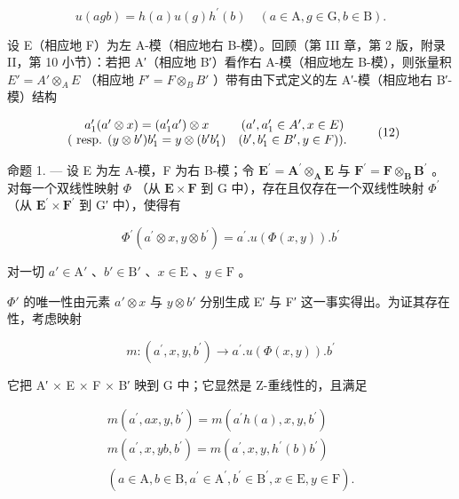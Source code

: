 \[
u (a g b) = h (a) u (g) h ^ {\prime} (b) \quad (a \in \mathrm{A}, g \in \mathrm{G}, b \in \mathrm{B}).\tag{11}
\]

设 E（相应地 F）为左 A-模（相应地右 B-模）。回顾（第 III 章，第 2 版，附录 II，第 10 小节）：若把 A′（相应地 B′）看作右 A-模（相应地左 B-模），则张量积 \(E' = A' \otimes_{A} E\) （相应地 \(F' = F \otimes_{B} B'\) ）带有由下式定义的左 A′-模（相应地右 B′-模）结构

\[
\begin{array}{c c} a _ {1} ^ {\prime} (a ^ {\prime} \otimes x) = (a _ {1} ^ {\prime} a ^ {\prime}) \otimes x & (a ^ {\prime}, a _ {1} ^ {\prime} \in A ^ {\prime}, x \in E) \\ (\text { resp. } (y \otimes b ^ {\prime}) b _ {1} ^ {\prime} = y \otimes (b ^ {\prime} b _ {1} ^ {\prime}) & (b ^ {\prime}, b _ {1} ^ {\prime} \in B ^ {\prime}, y \in F)). \end{array}\tag{12}
\]

命题 1. --- 设 E 为左 A-模，F 为右 B-模；令 \(\mathbf{E}^{\prime} = \mathbf{A}^{\prime}\otimes_{\mathbf{A}}\mathbf{E}\) 与 \(\mathbf{F}^{\prime} = \mathbf{F}\otimes_{\mathbf{B}}\mathbf{B}^{\prime}\) 。对每一个双线性映射 \(\Phi\) （从 \(\mathbf{E}\times \mathbf{F}\) 到 G 中），存在且仅存在一个双线性映射 \(\Phi^{\prime}\) （从 \(\mathbf{E}^{\prime}\times \mathbf{F}^{\prime}\) 到 G′ 中），使得有

\[
\Phi^ {\prime} (a ^ {\prime} \otimes x, y \otimes b ^ {\prime}) = a ^ {\prime}. u (\Phi (x, y)). b ^ {\prime}\tag{13}
\]

对一切 \(a' \in \mathrm{A}'\) 、\(b' \in \mathrm{B}'\) 、\(x \in \mathrm{E}\) 、\(y \in \mathrm{F}\) 。

\(\Phi'\) 的唯一性由元素 \(a' \otimes x\) 与 \(y \otimes b'\) 分别生成 E′ 与 F′ 这一事实得出。为证其存在性，考虑映射

\[
m: (a ^ {\prime}, x, y, b ^ {\prime}) \rightarrow a ^ {\prime}. u (\Phi (x, y)). b ^ {\prime}
\]

它把 A′ × E × F × B′ 映到 G 中；它显然是 Z-重线性的，且满足

\[
\begin{array}{r} m (a ^ {\prime}, a x, y, b ^ {\prime}) = m (a ^ {\prime} h (a), x, y, b ^ {\prime}) \\ m (a ^ {\prime}, x, y b, b ^ {\prime}) = m (a ^ {\prime}, x, y, h ^ {\prime} (b) b ^ {\prime}) \\ (a \in \mathrm{A}, b \in \mathrm{B}, a ^ {\prime} \in \mathrm{A} ^ {\prime}, b ^ {\prime} \in \mathrm{B} ^ {\prime}, x \in \mathrm{E}, y \in \mathrm{F}). \end{array}
\]

